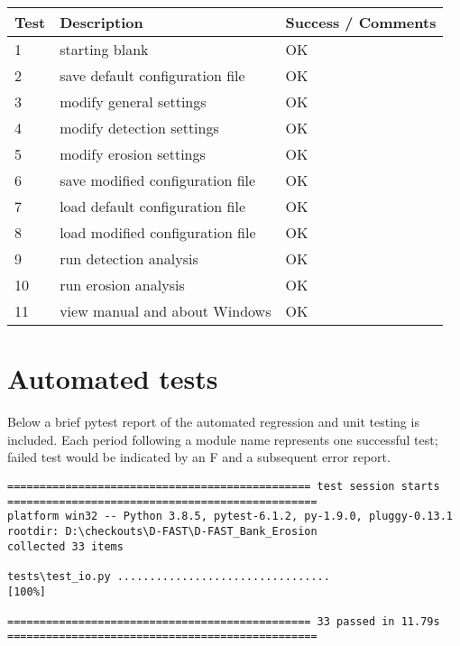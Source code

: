 \begin{tabular}{ll|l}
Test & Description & Success / Comments \\ \hline
1 & starting blank & OK \\
2 & save default configuration file & OK \\
3 & modify general settings & OK \\
4 & modify detection settings & OK \\
5 & modify erosion settings & OK \\
6 & save modified configuration file & OK \\
7 & load default configuration file & OK \\
8 & load modified configuration file & OK \\
9 & run detection analysis & OK \\
10 & run erosion analysis & OK \\
11 & view manual and about Windows & OK \\
\end{tabular}

\section{Automated tests}

Below a brief pytest report of the automated regression and unit testing is included.
Each period following a module name represents one successful test; failed test would be indicated by an F and a subsequent error report.

\begin{Verbatim}[fontsize=\tiny]
=============================================== test session starts ================================================
platform win32 -- Python 3.8.5, pytest-6.1.2, py-1.9.0, pluggy-0.13.1
rootdir: D:\checkouts\D-FAST\D-FAST_Bank_Erosion
collected 33 items

tests\test_io.py .................................                                                            [100%]

=============================================== 33 passed in 11.79s ================================================
\end{Verbatim}
